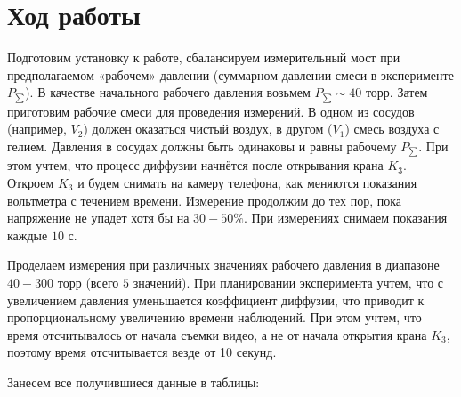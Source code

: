 \newpage

\section{Ход работы}

Подготовим установку к работе, сбалансируем измерительный мост при предполагаемом «рабочем» давлении (суммарном давлении смеси в эксперименте $P_{\sum}$). В качестве начального рабочего давления возьмем $P_{\sum} \sim 40$ торр. Затем приготовим рабочие смеси для проведения измерений. В одном из сосудов (например, $V_2$) должен оказаться чистый воздух, в другом ($V_1$) смесь воздуха с гелием. Давления в сосудах должны быть одинаковы и равны рабочему $P_{\sum}$. При этом учтем, что процесс диффузии начнётся после открывания крана $K_3$. Откроем $K_3$ и будем снимать на камеру телефона, как меняются показания вольтметра с течением времени. Измерение продолжим до тех пор, пока напряжение не упадет хотя бы на $30-50\%$. При измерениях снимаем показания каждые $10$ с. 

Проделаем измерения при различных значениях рабочего давления в диапазоне $40-300$ торр (всего $5$ значений). При планировании эксперимента учтем, что с увеличением давления уменьшается коэффициент диффузии, что приводит к пропорциональному увеличению времени наблюдений. При этом учтем, что время отсчитывалось от начала съемки видео, а не от начала открытия крана $K_3$, поэтому время отсчитывается везде от 10 секунд.

Занесем все получившиеся данные в таблицы:


